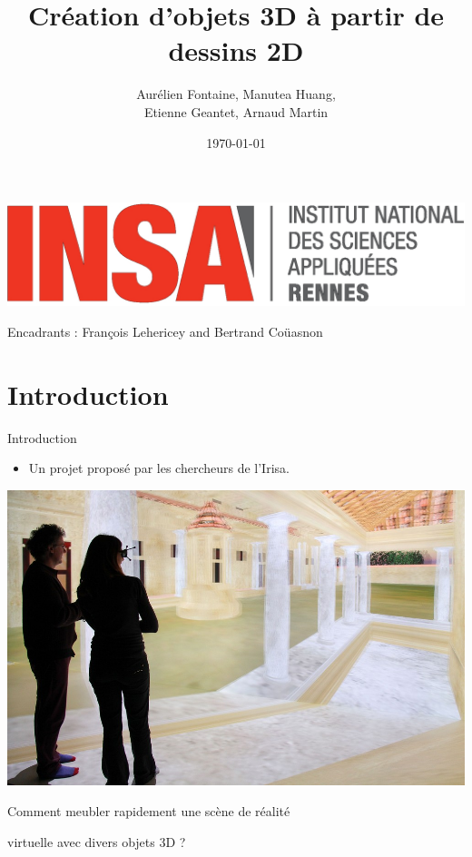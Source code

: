 \documentclass[a4paper,10pt]{beamer}
\title{Création d'objets 3D à partir de dessins 2D}
\author[Groupe 3INFO]{Aurélien Fontaine, Manutea Huang,
\\ Etienne Geantet, Arnaud Martin}
\institute[INSA de Rennes]{Institut National des Sciences Appliquées de Rennes}
\date{\today}
\begin{document}
	
	\begin{frame}
		\begin{titlepage}
			\centerline{\includegraphics[scale=0.1]{images/logos/logoINSA.jpg}}
			\centerline{Encadrants : François Lehericey and Bertrand Coüasnon}	
		\end{titlepage}
	\end{frame}
	
	\section{Introduction}
	
	\begin{frame}{Introduction}
		\begin{itemize}
		\item Un projet proposé par les chercheurs de l'Irisa.
		\end{itemize}
		\centerline{\includegraphics[scale=0.25]{images/intro/Immersia.jpg}}
		\centerline{Comment meubler rapidement une scène de réalité}
		\centerline{virtuelle avec divers objets 3D ?}
	\end{frame}
	
\end{document}
